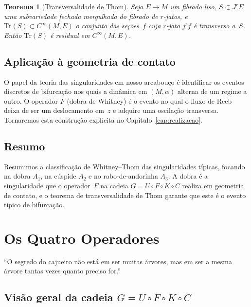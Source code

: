 \documentclass[12pt,a4paper,twoside]{book}
\theoremstyle{plain}
\newtheorem{teorema}{Teorema}[section]
\theoremstyle{definition}
\theoremstyle{definition}
\begin{document}
\begin{teorema}[Transversalidade de Thom]\label{thm:thom-transv}
Seja $E \to M$ um fibrado liso, $S \subset J^{r}E$ uma subvariedade
fechada mergulhada do fibrado de $r$-jatos, e
$\mathrm{Tr}(S) \subset C^{\infty}(M, E)$ o conjunto das seções~$f$
cuja $r$-jato $j^{r}f$ é transverso a~$S$. Então $\mathrm{Tr}(S)$
é residual em $C^{\infty}(M,E)$.
\end{teorema}

\section{Aplicação à geometria de contato}
\label{sec:sing-contato}

O papel da teoria das singularidades em nosso arcabouço é identificar os
eventos discretos de bifurcação nos quais a dinâmica em $(M,\alpha)$
alterna de um regime a outro. O operador $F$ (dobra de Whitney) é o
evento no qual o fluxo de Reeb deixa de ser um deslocamento em~$z$ e adquire
uma oscilação transversa. Tornaremos esta construção explícita no
Capítulo~\ref{cap:realizacao}.

\section{Resumo}

Resumimos a classificação de Whitney--Thom das singularidades típicas,
focando na dobra $A_{1}$, na cúspide $A_{2}$ e no rabo-de-andorinha $A_{3}$.
A dobra é a singularidade que o operador~$F$ na cadeia
$G = U \circ F \circ K \circ C$ realiza em geometria de contato, e o
teorema de transversalidade de Thom garante que este é o evento típico
de bifurcação.

\chapter{Os Quatro Operadores}
\label{cap:operadores}

\epigraph{``O segredo do cajueiro não está em ser muitas árvores, mas em ser
a mesma árvore tantas vezes quanto preciso for.''}{}

\section{Visão geral da cadeia $G = U \circ F \circ K \circ C$}
\end{document}
